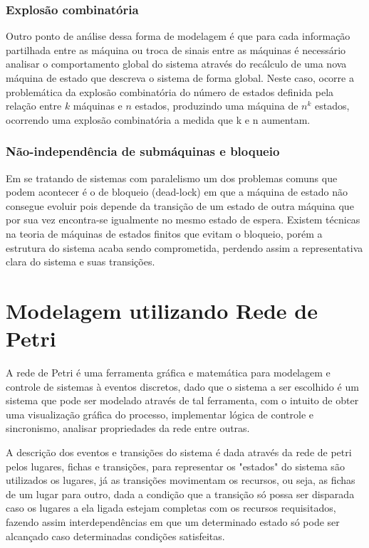 \subsubsection{Explosão combinatória}
Outro ponto de análise dessa forma de modelagem é que para cada informação partilhada entre as máquina ou troca de sinais entre as máquinas é necessário analisar o comportamento global do sistema através do recálculo de uma nova máquina de estado que descreva o sistema de forma global. Neste caso, ocorre a problemática da explosão combinatória do número de estados definida pela relação entre $k$ máquinas e $n$ estados, produzindo uma máquina de $n^k $ estados, ocorrendo uma explosão combinatória a medida que k e n aumentam.

\subsubsection{Não-independência de submáquinas e bloqueio}
Em se tratando de sistemas com paralelismo um dos problemas comuns que podem acontecer é o de bloqueio (dead-lock) em que a máquina de estado não consegue evoluir pois depende da transição de um estado de outra máquina que por sua vez encontra-se igualmente no mesmo estado de espera. Existem técnicas na teoria de máquinas de estados finitos que evitam o bloqueio, porém a estrutura do sistema acaba sendo comprometida, perdendo assim a representativa clara do sistema e suas transições.

\section{Modelagem utilizando Rede de Petri}

A rede de Petri é uma ferramenta gráfica e matemática para modelagem e controle de sistemas à eventos discretos, dado que o sistema a ser escolhido é um sistema que pode ser modelado através de tal ferramenta, com o intuito de obter uma visualização gráfica do processo, implementar lógica de controle e sincronismo, analisar propriedades da rede entre outras.

A descrição dos eventos e transições do sistema é dada através da rede de petri pelos lugares, fichas e transições, para representar os "estados" do sistema são utilizados os lugares, já as transições movimentam os recursos, ou seja, as fichas de um lugar para outro, dada a condição que a transição só possa ser disparada caso os lugares a ela ligada estejam completas com os recursos requisitados, fazendo assim interdependências em que um determinado estado só pode ser alcançado caso determinadas condições satisfeitas.

